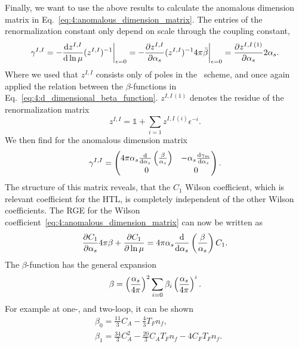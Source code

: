 Finally, we want to use the above results to calculate the anomalous dimension matrix in Eq.~\eqref{eq:4:anomalous_dimension_matrix}. The entries of the renormalization constant only depend on scale through the coupling constant, \ie\
\begin{equation}
\gamma^{I,I} = -\frac{\mathrm{d} z^{I,I}}{\mathrm{d} \ln \mu} (z^{I,I})^{-1} \bigg \vert_{\epsilon = 0} = -\frac{\partial z^{I,I}}{\partial \alpha_s} (z^{I,I})^{-1} 4 \pi \bar{\beta} \bigg \vert_{\epsilon = 0} = \frac{\partial z^{I,I\,(1)}}{\partial \alpha_s} 2 \alpha_s.
\end{equation}
Where we used that $z^{I,I}$ consists only of poles in the \MS\ scheme, and once again applied the relation between the $\beta$-functions in Eq.~\eqref{eq:4:d_dimensional_beta_function}. $z^{I,I\, (1)}$ denotes the residue of the renormalization matrix
\begin{equation}
z^{I,I} = \mathbb{1} + \sum_{i = 1} z^{I,I\,(i)} \epsilon^{-i}.
\end{equation}
We then find for the anomalous dimension matrix
\begin{equation}
\gamma^{I,I} = \begin{pmatrix} 4 \pi \alpha_s \frac{\mathrm{d}}{\mathrm{d} \alpha_s} \left( \frac{\beta}{\alpha_s} \right) & - \alpha_s \frac{\mathrm{d} \gamma_m}{\mathrm{d} \alpha_s} \\
0 & 0 \end{pmatrix}.
\end{equation}
The structure of this matrix reveals, that the $C_1$ Wilson coefficient, which is relevant coefficient for the  \acs{HTL}, is completely independent of the other Wilson coefficients. The \acs{RGE} for the Wilson coefficient~\eqref{eq:4:anomalous_dimension_matrix} can now be written as \
\begin{equation}
\frac{\partial C_1}{\partial \alpha_s} 4 \pi \beta + \frac{\partial C_1}{\partial \ln \mu} = 4 \pi \alpha_s \frac{\mathrm{d} }{\mathrm{d} \alpha_s} \left(\frac{\beta}{\alpha_s} \right) C_1.
\label{eq:4:RGE_of_C1}
\end{equation}
The $\beta$-function has the general expansion
\begin{equation}
\beta = \left(\frac{\alpha_s}{4 \pi} \right)^2 \sum_{i = 0} \beta_i \left(\frac{\alpha_s}{4 \pi} \right)^i.
\end{equation}
For example at one-, and two-loop, it can be shown~\cite{Gross:1973id, Politzer:1973fx, tHooft:1972ikm, Caswell:1974gg, Jones:1974mm, Egorian:1978zx}
\begin{equation}
\begin{split}
&\beta_0 = \frac{11}{3} C_A - \frac{4}{3} T_F n_f, \\
&\beta_1 = \frac{34}{3} C_A^2 - \frac{20}{3} C_A T_F n_f - 4 C_F T_F n_f.
\end{split}
\label{eq:4:beta0_and_beta1}
\end{equation}
